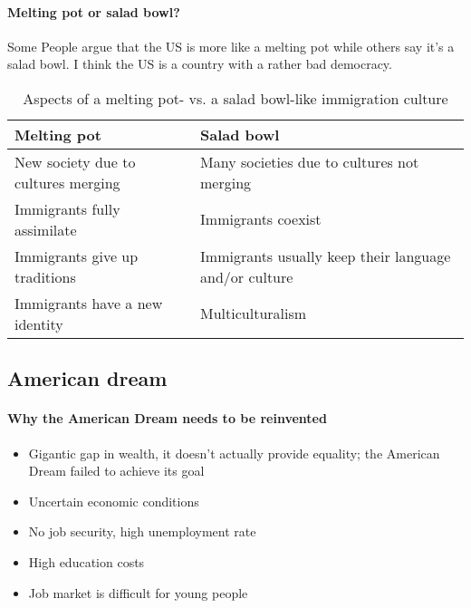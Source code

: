 \documentclass[10pt]{article}
\begin{document}
\paragraph{Melting pot or salad bowl?} Some People argue that the US is more like a melting pot while others say it's a salad bowl.
I think the US is a country with a rather bad democracy.
\begin{table}[htbp]
	\centering
	\begin{tabularx}{\textwidth}{X X}
		\hline
		{\sffamily\bfseries Melting pot} & {\sffamily\bfseries Salad bowl} \\ \hline
		New society due to cultures merging & Many societies due to cultures not merging \\
		Immigrants fully assimilate & Immigrants coexist \\
		Immigrants give up traditions & Immigrants usually keep their language and/or culture \\
		Immigrants have a new identity & Multiculturalism \\ \hline
	\end{tabularx}
	\caption{Aspects of a melting pot- vs. a salad bowl-like immigration culture}
	\label{tab:usa/immig/meltingpot}
\end{table}
\newpage
\subsection{American dream}\label{sec:usa/dream}
\paragraph{Why the American Dream needs to be reinvented}
\begin{itemize}
\item Gigantic gap in wealth, it doesn’t actually provide equality; the American Dream failed to achieve its goal
\item Uncertain economic conditions
\item No job security, high unemployment rate
\item High education costs
\item Job market is difficult for young people
\end{itemize}
\end{document}
